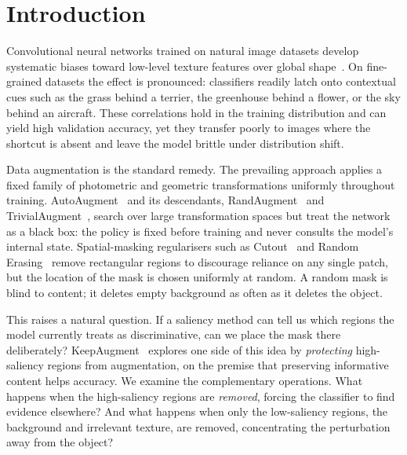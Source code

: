 \section{Introduction}
\label{sec:intro}

Convolutional neural networks trained on natural image datasets develop
systematic biases toward low-level texture features over global
shape~\citep{geirhos2019texture}.  On fine-grained datasets the effect is
pronounced: classifiers readily latch onto contextual cues such as the grass
behind a terrier, the greenhouse behind a flower, or the sky behind an
aircraft.  These correlations hold in the training distribution and can yield
high validation accuracy, yet they transfer poorly to images where the shortcut
is absent and leave the model brittle under distribution shift.

Data augmentation is the standard remedy.  The prevailing approach applies a
fixed family of photometric and geometric transformations uniformly throughout
training.  AutoAugment~\citep{cubuk2019autoaugment} and its descendants,
RandAugment~\citep{cubuk2020randaugment} and
TrivialAugment~\citep{muller2021trivialaugment}, search over large
transformation spaces but treat the network as a black box: the policy is fixed
before training and never consults the model's internal state.  Spatial-masking
regularisers such as Cutout~\citep{devries2017cutout} and Random
Erasing~\citep{zhong2020randomerasing} remove rectangular regions to discourage
reliance on any single patch, but the location of the mask is chosen uniformly
at random.  A random mask is blind to content; it deletes empty background as
often as it deletes the object.

This raises a natural question.  If a saliency method can tell us which regions
the model currently treats as discriminative, can we place the mask there
deliberately?  KeepAugment~\citep{gong2021keepaugment} explores one side of
this idea by \emph{protecting} high-saliency regions from augmentation, on the
premise that preserving informative content helps accuracy.  We examine the
complementary operations.  What happens when the high-saliency regions are
\emph{removed}, forcing the classifier to find evidence elsewhere?  And what
happens when only the low-saliency regions, the background and irrelevant
texture, are removed, concentrating the perturbation away from the object?

